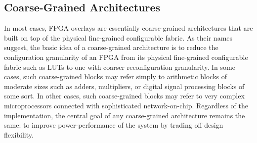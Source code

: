 \fi


\subsection{Coarse-Grained Architectures}
In most cases, FPGA overlays are essentially coarse-grained architectures that are built on top of the physical fine-grained configurable fabric.
As their names suggest, the basic idea of a coarse-grained architecture is to reduce the configuration granularity of an FPGA from its physical fine-grained configurable fabric such as LUTs to one with coarser reconfiguration granularity.
In some cases, such coarse-grained blocks may refer simply to arithmetic blocks of moderate sizes such as adders, multipliers, or digital signal processing blocks of some sort.
In other cases, such coarse-grained blocks may refer to very complex microprocessors connected with sophisticated network-on-chip.
Regardless of the implementation, the central goal of any coarse-grained architecture remains the same: to improve power-performance of the system by trading off design flexibility.


